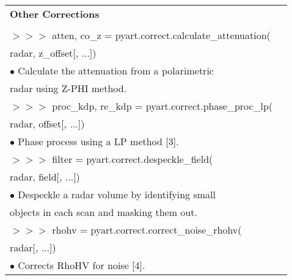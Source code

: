 \documentclass[potrait, z1paper, fontscale=0.33]{baposter} %
\begin{document}
\begin{poster}
{\begin{flushleft}
\begin{tabular}{@{}ll@{}}
\\
\multicolumn{2}{l}{\cellcolor[HTML]{DDFFFF}\bf Other Corrections} \\
\\
$>$$>$$>$ atten, co\_z = pyart.correct.calculate\_attenuation(\\
\-\hspace{1.5cm} radar, z\_offset[, ...])\\
\-\hspace{0.4cm} $\bullet$ Calculate the attenuation from a polarimetric\\
\-\hspace{0.7cm} radar using Z-PHI method.\\
$>$$>$$>$ proc\_kdp, re\_kdp = pyart.correct.phase\_proc\_lp(\\
\-\hspace{1.5cm} radar, offset[, ...])\\
\-\hspace{0.4cm} $\bullet$ Phase process using a LP method [3].\\
$>$$>$$>$ filter = pyart.correct.despeckle\_field(\\
\-\hspace{1.5cm} radar, field[, ...])\\
\-\hspace{0.4cm} $\bullet$ Despeckle a radar volume by identifying small\\
\-\hspace{0.7cm} objects in each scan and masking them out.\\
$>$$>$$>$ rhohv = pyart.correct.correct\_noise\_rhohv(\\
\-\hspace{1.5cm} radar[, ...])\\
\-\hspace{0.4cm} $\bullet$ Corrects RhoHV for noise [4].\\


\end{tabular}
\end{flushleft}

}


\end{poster}
\end{document}

